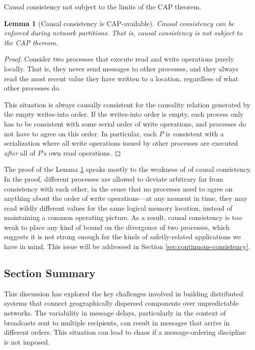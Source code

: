 \documentclass[]             %
{NASA}                       %
\newtheorem{lemma}[theorem]{Lemma}
\theoremstyle{definition}
\begin{document}
Causal consistency not subject to the limits of the CAP theorem.

\begin{lemma}[Causal consistency is CAP-available]
  \label{thm:cap-causal}
  Causal consistency can be enforced during network partitions. That
  is, causal consistency is not subject to the CAP thereom.
\end{lemma}
\begin{proof}
  Consider two processes that execute read and write operations purely
  locally. That is, they never send messages to other processes, and
  they always read the most recent value they have written to a
  location, regardless of what other processes do.

  This situation is always causally consistent for the causality
  relation generated by the empty writes-into order. If the
  writes-into order is empty, each process only has to be consistent
  with some serial order of write operations, and processes do not
  have to agree on this order. In particular, each $P$ is
  consistent with a serialization where all write operations issued by
  other processes are executed \emph{after} all of $P$'s own read
  operations.
\end{proof}

The proof of the Lemma \ref{thm:cap-causal} speaks mostly to the
weakness of of causal consistency. In the proof, different processes
are allowed to deviate arbitrary far from consistency with each other,
in the sense that no processes need to agree on anything about the
order of write operations---at any moment in time, they may read
wildly different values for the same logical memory location, instead
of maintaining a common operating picture. As a result, causal
consistency is too weak to place any kind of bound on the divergence
of two processes, which suggests it is not strong enough for the kinds
of safetly-related applications we have in mind. This issue will be
addressed in Section \ref{sec:continuous-consistency}.

\subsection{Section Summary}
\label{ssec:background-summary}
This discussion has explored the key challenges involved in building
distributed systems that connect geographically dispersed components
over unpredictable networks. The variability in message delays,
particularly in the context of broadcasts sent to multiple recipients,
can result in messages that arrive in different orders.  This
situation can lead to chaos if a message-ordering discipline is not
imposed.
\end{document}
